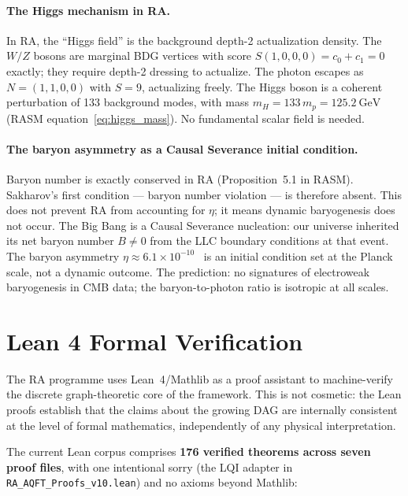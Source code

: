 \documentclass[11pt,a4paper]{article}
\begin{document}
\paragraph{The Higgs mechanism in RA.}
In RA, the ``Higgs field'' is the background depth-2 actualization density.
The $W/Z$ bosons are marginal BDG vertices with score $S(1,0,0,0) = c_0 + c_1
= 0$ exactly; they require depth-2 dressing to actualize. The photon escapes
as $N = (1,1,0,0)$ with $S = 9$, actualizing freely. The Higgs boson is a
coherent perturbation of 133 background modes, with mass $m_H = 133\,m_p
= 125.2~\mathrm{GeV}$ (RASM equation~\ref*{eq:higgs_mass}).
No fundamental scalar field is needed.

\paragraph{The baryon asymmetry as a Causal Severance initial condition.}
Baryon number is exactly conserved in RA (Proposition~5.1 in RASM).
Sakharov's first condition — baryon number violation — is therefore
absent. This does not prevent RA from accounting for $\eta$; it means
dynamic baryogenesis does not occur. The Big Bang is a Causal Severance
nucleation: our universe inherited its net baryon number $B \neq 0$
from the LLC boundary conditions at that event. The baryon asymmetry
$\eta \approx 6.1\times 10^{-10}$~\citep{PDG2022} is an initial
condition set at the Planck scale, not a dynamic outcome. The prediction:
no signatures of electroweak baryogenesis in CMB data; the
baryon-to-photon ratio is isotropic at all scales.

\section{Lean 4 Formal Verification}
\label{sec:lean}

The RA programme uses Lean~4/Mathlib as a proof assistant to machine-verify
the discrete graph-theoretic core of the framework. This is not cosmetic:
the Lean proofs establish that the claims about the growing DAG are
internally consistent at the level of formal mathematics, independently
of any physical interpretation.

The current Lean corpus comprises \textbf{176 verified theorems across seven
proof files}, with one intentional sorry (the LQI adapter in
\texttt{RA\_AQFT\_Proofs\_v10.lean}) and no axioms beyond Mathlib:
\end{document}
